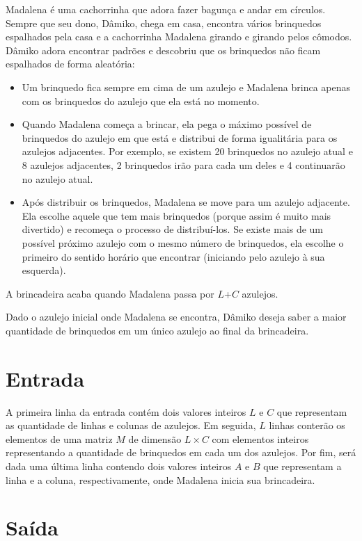 Madalena é uma cachorrinha que adora fazer bagunça e andar em círculos. Sempre que seu dono, Dâmiko, chega em casa, encontra vários brinquedos espalhados pela casa e a cachorrinha Madalena girando e girando pelos cômodos.
Dâmiko adora encontrar padrões e descobriu que os brinquedos não ficam espalhados de forma aleatória:

\begin{itemize}
  \item Um brinquedo fica sempre em cima de um azulejo e Madalena brinca apenas com os brinquedos do azulejo que ela está no momento.
  \item Quando Madalena começa a brincar, ela pega o máximo possível de brinquedos do azulejo em que está e distribui de forma igualitária para os azulejos adjacentes. Por exemplo, se existem 20 brinquedos no azulejo atual e 8 azulejos adjacentes, 2 brinquedos irão para cada um deles e 4 continuarão no azulejo atual.
  \item Após distribuir os brinquedos, Madalena se move para um azulejo adjacente. Ela escolhe aquele que tem mais brinquedos (porque assim é muito mais divertido) e recomeça o processo de distribuí-los. Se existe mais de um possível próximo azulejo com o mesmo número de brinquedos, ela escolhe o primeiro do sentido horário que encontrar (iniciando pelo azulejo à sua esquerda).
\end{itemize}

A brincadeira acaba quando Madalena passa por $L$+$C$ azulejos.

Dado o azulejo inicial onde Madalena se encontra, Dâmiko deseja saber a maior quantidade de brinquedos em um único azulejo ao final da brincadeira.

\section*{Entrada}

A primeira linha da entrada contém dois valores inteiros $L$ e $C$ que representam as quantidade de linhas e colunas de azulejos. Em seguida, $L$ linhas conterão os elementos de uma matriz $M$ de dimensão $L \times C$ com elementos inteiros representando a quantidade de brinquedos em cada um dos azulejos.
Por fim, será dada uma última linha contendo dois valores inteiros $A$ e $B$ que representam a linha e a coluna, respectivamente, onde Madalena inicia sua brincadeira.

\section*{Saída}

